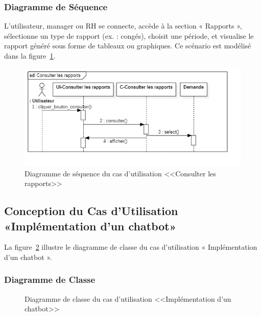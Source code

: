 \subsubsection{Diagramme de Séquence}
L’utilisateur, manager ou RH se connecte, accède à la section « Rapports », sélectionne un type de rapport (ex. : congés), choisit une période, et visualise le rapport généré sous forme de tableaux ou graphiques. Ce scénario est modélisé dans la figure~\ref{fig:seq_consult_reports}.
\begin{figure}[h]
    \centering
    \includegraphics[width=13cm]{images/S_rapports.jpg}
    \caption{Diagramme de séquence du cas d'utilisation <<Consulter les rapports>>}
    \label{fig:seq_consult_reports}
\end{figure}
\subsection{Conception du Cas d'Utilisation «Implémentation d’un chatbot»}
La figure~\ref{fig:class_implement_chatbot} illustre le diagramme de classe du cas d’utilisation « Implémentation d’un chatbot ».
\newpage
\subsubsection{Diagramme de Classe}
\begin{figure}[h]
     \centering
     \caption{Diagramme de classe du cas d'utilisation <<Implémentation d’un chatbot>>}
     \label{fig:class_implement_chatbot}
\end{figure}
